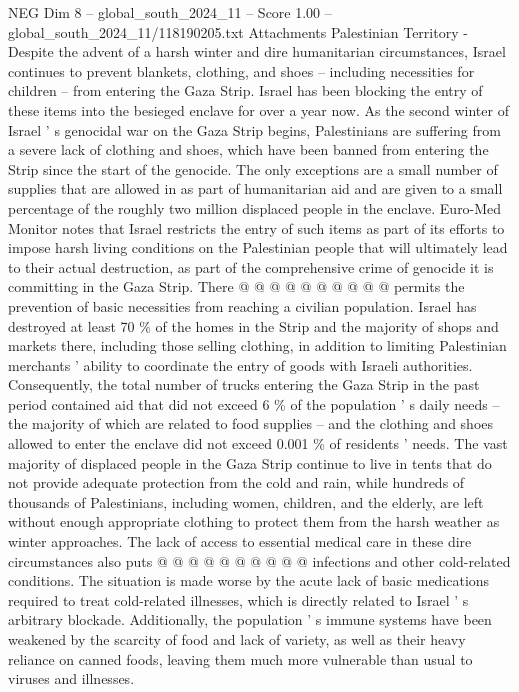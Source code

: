 \begin{textsample}{NEG Dim 8 – global\_south\_2024\_11 – Score 1.00 – global\_south\_2024\_11/118190205.txt}  \label{ex:f8_neg_294}
Attachments Palestinian Territory - Despite the advent of a harsh winter and dire humanitarian circumstances, Israel continues to prevent blankets, clothing, and shoes -- including necessities for children -- from entering the Gaza Strip.
Israel has been blocking the entry of these items into the besieged enclave for over a year now.
As the second winter of Israel ' s genocidal war on the Gaza Strip begins, Palestinians are suffering from a severe lack of clothing and shoes, which have been banned from entering the Strip since the start of the genocide.
The only exceptions are a small number of supplies that are allowed in as part of humanitarian aid and are given to a small percentage of the roughly two million displaced people in the enclave.
Euro-Med Monitor notes that Israel restricts the entry of such items as part of its efforts to impose harsh living conditions on the Palestinian people that will ultimately lead to their actual destruction, as part of the comprehensive crime of genocide it is committing in the Gaza Strip.
There @ @ @ @ @ @ @ @ @ @ permits the prevention of basic necessities from reaching a civilian population.
Israel has destroyed at least 70 \% of the homes in the Strip and the majority of shops and markets there, including those selling clothing, in addition to limiting Palestinian merchants ' ability to coordinate the entry of goods with Israeli authorities.
Consequently, the total number of trucks entering the Gaza Strip in the past period contained aid that did not exceed 6 \% of the population ' s daily needs -- the majority of which are related to food supplies -- and the clothing and shoes allowed to enter the enclave did not exceed 0.001 \% of residents ' needs.
The vast majority of displaced people in the Gaza Strip continue to live in tents that do not provide adequate protection from the cold and rain, while hundreds of thousands of Palestinians, including women, children, and the elderly, are left without enough appropriate clothing to protect them from the harsh weather as winter approaches.
The lack of access to essential medical care in these dire circumstances also puts @ @ @ @ @ @ @ @ @ @ infections and other cold-related conditions.
The situation is made worse by the acute lack of basic medications required to treat cold-related illnesses, which is directly related to Israel ' s arbitrary blockade.
Additionally, the population ' s immune systems have been weakened by the scarcity of food and lack of variety, as well as their heavy reliance on canned foods, leaving them much more vulnerable than usual to viruses and illnesses.

\end{textsample}

